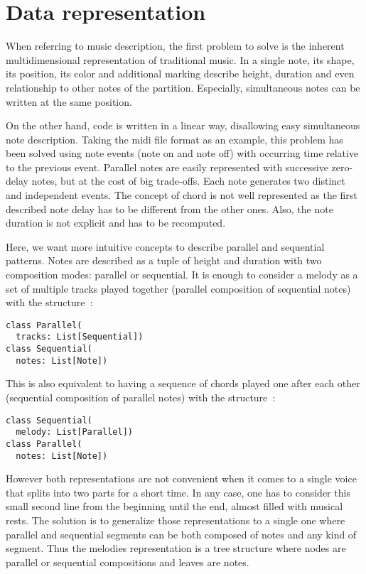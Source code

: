 \documentclass[twocolumn, 11pt]{article}
\begin{document}
\section{Data representation}

When referring to music description, the first problem to solve is the inherent multidimensional representation of traditional music. In a single note, its shape, its position, its color and additional marking describe height, duration and even relationship to other notes of the partition.
Especially, simultaneous notes can be written at the same position.

On the other hand, code is written in a linear way, disallowing easy simultaneous note description.
Taking the midi file format as an example, this problem has been solved using note events (note on and note off) with occurring time relative to the previous event.
Parallel notes are easily represented with successive zero-delay notes, but at the cost of big trade-offs. Each note generates two distinct and independent events. The concept of chord is not well represented as the first described note delay has to be different from the other ones.
Also, the note duration is not explicit and has to be recomputed.

Here, we want more intuitive concepts to describe parallel and sequential patterns. Notes are described as a tuple of height and duration with two composition modes: parallel or sequential.
It is enough to consider a melody as a set of multiple tracks played together (parallel composition of sequential notes) with the structure~:
\begin{lstlisting}
class Parallel(
  tracks: List[Sequential])
class Sequential(
  notes: List[Note])
\end{lstlisting}

This is also equivalent to having a sequence of chords played one after each other (sequential composition of parallel notes) with the structure~:
\begin{lstlisting}
class Sequential(
  melody: List[Parallel])
class Parallel(
  notes: List[Note])
\end{lstlisting}

However both representations are not convenient when it comes to a single voice that splits into two parts for a short time.
In any case, one has to consider this small second line from the beginning until the end, almost filled with musical rests.
The solution is to generalize those representations to a single one where parallel and sequential segments can be both composed of notes and any kind of segment.
Thus the melodies representation is a tree structure where nodes are parallel or sequential compositions and leaves are notes.
\end{document}
